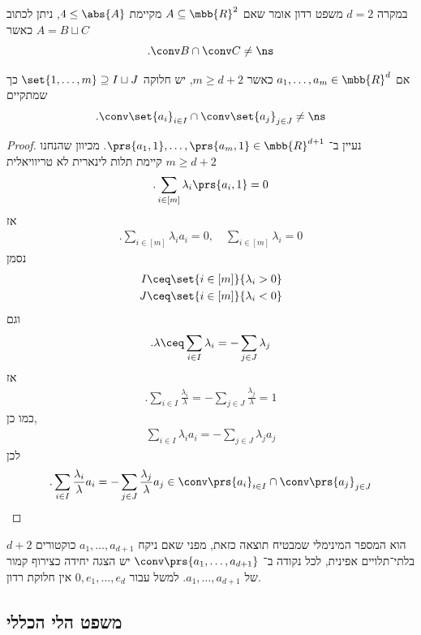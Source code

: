 \documentclass[a4paper,10pt,twoside,openany]{book}
\begin{document}
במקרה
$d = 2$
משפט רדון אומר שאם
$A \subseteq \mbb{R}^2$
מקיימת
$4 \leq \abs{A}$,
ניתן לכתוב
$A = B \sqcup C$
כאשר
\[\text{.} \conv B \cap \conv C \neq \ns\]

\begin{theorem}[רדון]
אם
$a_1, \ldots, a_m \in \mbb{R}^d$
כאשר
$m \geq d + 2$,
יש חלוקה
$\set{1, \ldots, m} \supseteq I \sqcup J$
כך שמתקיים
\[\text{.} \conv \set{a_i}_{i \in I} \cap \conv \set{a_j}_{j \in J} \neq \ns\]
\end{theorem}

\begin{proof}
נעיין ב־%
$\prs{a_1, 1}, \ldots, \prs{a_m,1} \in \mbb{R}^{d+1}$.
מכיוון שהנחנו
$m \geq d+2$
קיימת תלות לינארית לא טריוויאלית
\[\text{.} \sum_{i \in [m]} \lambda_i \prs{a_i, 1} = 0\]
אז
\begin{align*}
\text{.} \sum_{i \in [m]} \lambda_i a_i = 0 , \quad \sum_{i \in [m]} \lambda_i = 0
\end{align*}
נסמן
\begin{align*}
I &\ceq \set{i \in [m]}{\lambda_i > 0} \\
J &\ceq \set{i \in [m]}{\lambda_i < 0}
\end{align*}
וגם
\[\text{.} \lambda \ceq \sum_{i \in I} \lambda_i = - \sum_{j \in J} \lambda_j\]
אז
\begin{align*}
\text{.} \sum_{i \in I} \frac{\lambda_i}{\lambda} = -\sum_{j \in J} \frac{\lambda_j}{\lambda} = 1
\end{align*}
כמו כן,
\begin{align*}
\sum_{i \in I} \lambda_i a_i = - \sum_{j \in J} \lambda_j a_j
\end{align*}
לכן
\begin{align*}
\text{.} \sum_{i \in I} \frac{\lambda_i}{\lambda} a_i = - \sum_{j \in J} \frac{\lambda_j}{\lambda} a_j \in \conv\prs{a_i}_{i \in I} \cap \conv\prs{a_j}_{j \in J}
\end{align*}
\end{proof}

\begin{remark}
$d+2$
הוא המספר המינימלי שמבטיח תוצאה כזאת, מפני שאם ניקח
$a_1, \ldots, a_{d+1}$
כוקטורים בלתי־תלויים אפינית, לכל נקודה ב־%
$\conv\prs{a_1, \ldots, a_{d+1}}$
יש הצגה יחידה כצירוף קמור של
$a_1, \ldots, a_{d+1}$.
למשל עבור
$0, e_1, \ldots, e_d$
אין חלוקת רדון.
\end{remark}

\subsection{משפט הלי הכללי}
\end{document}
